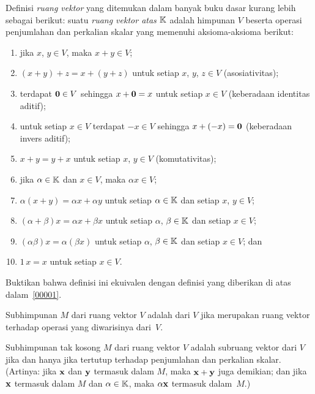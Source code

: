 \begin{exer} Definisi \emph{ruang vektor} yang ditemukan dalam banyak buku dasar kurang lebih
sebagai berikut: suatu \emph{ruang vektor atas} $\mathbb{K}$ adalah himpunan $V$ beserta operasi
penjumlahan dan perkalian skalar yang memenuhi aksioma-aksioma berikut:
 \begin{enumerate}
  \item[(1)] jika $x$, $y \in V$, maka $x + y \in V$;
  \item[(2)] $(x + y) + z = x + (y + z)$ untuk setiap
$x$, $y$, $z \in V$ (asosiativitas);
  \item[(3)] terdapat $\mathbf{0} \in V$ sehingga $x + \mathbf{0} = x$ untuk setiap
$x \in V$ (keberadaan identitas aditif);
  \item[(4)] untuk setiap $x\in V$ terdapat $-x \in V$ sehingga
$x + (-x) = \mathbf{0}$ (keberadaan invers aditif);
  \item[(5)] $x + y = y + x$ untuk setiap $x$, $y \in V$
(komutativitas);
  \item[(6)] jika $\alpha \in \mathbb{K}$ dan $x \in V$, maka $\alpha x \in V$;
  \item[(7)] $\alpha (x + y) = \alpha x + \alpha y$ untuk setiap $\alpha \in \mathbb{K}$
dan setiap $x$, $y \in V$;
  \item[(8)] $(\alpha + \beta)x = \alpha x + \beta x$ untuk setiap $\alpha$,
$\beta \in \mathbb{K}$ dan setiap $x \in V$;
  \item[(9)] $(\alpha\beta)x = \alpha(\beta x)$ untuk setiap $\alpha$,
$\beta \in \mathbb{K}$ dan setiap $x \in V$; dan
  \item[(10)] $1\,x = x$ untuk setiap $x \in V$.
 \end{enumerate}
Buktikan bahwa definisi ini ekuivalen dengan definisi yang diberikan di atas dalam~\ref{00001}.
\end{exer}

\begin{defn} Subhimpunan $M$ dari ruang vektor $V$ adalah
 dari $V$ jika merupakan ruang vektor terhadap operasi yang diwarisinya dari~$V$.
\end{defn}

\begin{prop} Subhimpunan tak kosong $M$ dari ruang vektor $V$ adalah subruang vektor dari $V$ jika dan
hanya jika tertutup terhadap penjumlahan dan perkalian skalar. (Artinya: jika $\mathbf{x}$ dan
$\mathbf{y}$ termasuk dalam $M$, maka $\mathbf{x} + \mathbf{y}$ juga demikian; dan jika $\mathbf{x}$ termasuk dalam $M$ dan $\alpha
\in \mathbb{K}$, maka $\alpha \mathbf{x}$ termasuk dalam~$M$.)
\end{prop}

